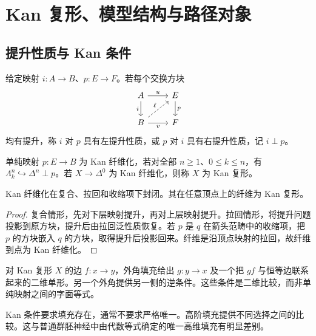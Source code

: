 \chapter{Kan 复形、模型结构与路径对象}
\section{提升性质与 Kan 条件}
\begin{definition}[提升性质]
给定映射 $i:A\to B$、$p:E\to F$。若每个交换方块
\[
\begin{tikzcd}
A\ar[r,"u"]\ar[d,"i"']&E\ar[d,"p"]\\
B\ar[r,"v"']\ar[ur,dashed,"\ell"]&F
\end{tikzcd}
\]
均有提升，称 $i$ 对 $p$ 具有左提升性质，或 $p$ 对 $i$ 具有右提升性质，记 $i\perp p$。
\end{definition}
\begin{definition}
单纯映射 $p:E\to B$ 为 Kan 纤维化，若对全部 $n\ge1$、$0\le k\le n$，有 $\Lambda_k^n\hookrightarrow\Delta^n\perp p$。若 $X\to\Delta^0$ 为 Kan 纤维化，则称 $X$ 为 Kan 复形。
\end{definition}
\begin{proposition}[纤维化的稳定性]
Kan 纤维化在复合、拉回和收缩项下封闭。其在任意顶点上的纤维为 Kan 复形。
\end{proposition}
\begin{proof}
复合情形，先对下层映射提升，再对上层映射提升。拉回情形，将提升问题投影到原方块，提升后由拉回泛性质恢复。若 $p$ 是 $q$ 在箭头范畴中的收缩项，把 $p$ 的方块嵌入 $q$ 的方块，取得提升后投影回来。纤维是沿顶点映射的拉回，故纤维到点为 Kan 纤维化。
\end{proof}
\begin{example}[外角恢复逆]
对 Kan 复形 $X$ 的边 $f:x\to y$，外角填充给出 $g:y\to x$ 及一个把 $gf$ 与恒等边联系起来的二维单形。另一个外角提供另一侧的逆条件。这些条件是二维比较，而非单纯映射之间的字面等式。
\end{example}
\begin{remark}
Kan 条件要求填充存在，通常不要求严格唯一。高阶填充提供不同选择之间的比较。这与普通群胚神经中由代数等式确定的唯一高维填充有明显差别。
\end{remark}

